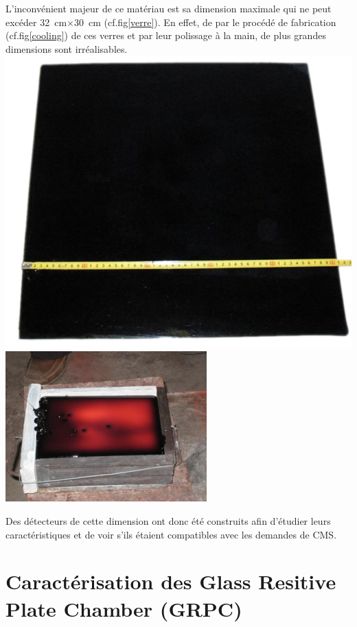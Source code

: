 L'inconvénient majeur de ce matériau est sa dimension maximale qui ne peut excéder \SI{32}{\centi\meter}$\times$\SI{30}{\centi\meter} (cf.fig\ref{verre}). En effet, de par le procédé de fabrication (cf.fig\ref{cooling}) de ces verres et par leur polissage à la main, de plus grandes dimensions sont irréalisables.
\marginpar
{
	\centering
	\includegraphics[width=\marginparwidth]{GLA/verre.png}
	\label{verre}
}
\marginpar
{
	\centering
	\includegraphics[width=\marginparwidth]{GLA/cooling.png}
	\label{cooling}
}

Des détecteurs de cette dimension ont donc été construits afin d'étudier leurs caractéristiques et de voir s'ils étaient compatibles avec les demandes de CMS.

\section{Caractérisation des Glass Resitive Plate Chamber (GRPC)}
 
